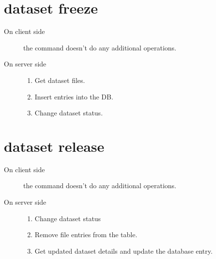 \documentclass{scrreprt}
\begin{document}
\section{dataset freeze} 
\begin{description}

%
\item[On client side] the command doesn't do any additional operations.
%
\item[On server side] \hfill
\begin{enumerate} 
\item Get dataset files.
\item Insert entries into the DB.
\item Change dataset status.

\end{enumerate}

\end{description}



\section{dataset release} 
\begin{description}

%
\item[On client side] the command doesn't do any additional operations.

%
\item[On server side] \hfill
\begin{enumerate} 
\item Change dataset status
\item Remove file entries from the table.
\item Get updated dataset details and update the database entry.

\end{enumerate}

\end{description}
\end{document}
